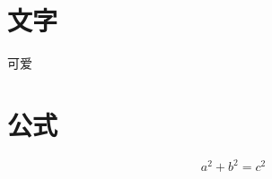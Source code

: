 \documentclass[UTF8]{ctexart}
\begin{document}
\section{文字}
可爱

\section{公式}

\[
	a^2 + b^2 = c^2
\]
\end{document}
